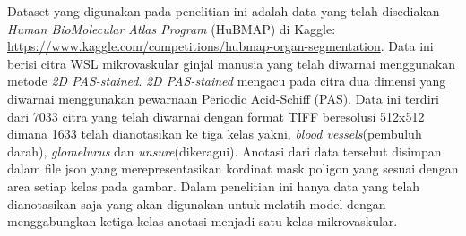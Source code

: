 \noindent Dataset yang digunakan pada penelitian ini adalah data yang telah disediakan \textit{Human BioMolecular Atlas Program }(HuBMAP) di Kaggle: \url{https://www.kaggle.com/competitions/hubmap-organ-segmentation}\cite{howard_hubmap_2023}.  Data ini berisi citra WSL mikrovaskular ginjal manusia yang telah diwarnai menggunakan metode \textit{2D PAS-stained}. \textit{2D PAS-stained} mengacu pada citra dua dimensi yang diwarnai menggunakan pewarnaan Periodic Acid-Schiff (PAS). Data ini terdiri dari 7033 citra yang telah diwarnai dengan format TIFF beresolusi 512x512 dimana 1633 telah dianotasikan ke tiga kelas yakni, \textit{blood vessels}(pembuluh darah), \textit{glomelurus} dan \textit{unsure}(dikeragui).  Anotasi dari data tersebut disimpan dalam file json yang merepresentasikan kordinat mask poligon yang sesuai dengan area setiap kelas pada gambar. Dalam penelitian ini hanya data yang telah dianotasikan saja yang akan digunakan untuk melatih model dengan menggabungkan ketiga kelas anotasi menjadi satu kelas mikrovaskular.

